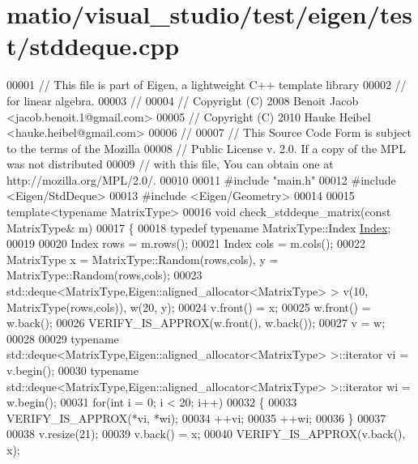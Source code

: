 \hypertarget{matio_2visual__studio_2test_2eigen_2test_2stddeque_8cpp_source}{}\section{matio/visual\+\_\+studio/test/eigen/test/stddeque.cpp}
\label{matio_2visual__studio_2test_2eigen_2test_2stddeque_8cpp_source}

\begin{DoxyCode}
00001 \textcolor{comment}{// This file is part of Eigen, a lightweight C++ template library}
00002 \textcolor{comment}{// for linear algebra.}
00003 \textcolor{comment}{//}
00004 \textcolor{comment}{// Copyright (C) 2008 Benoit Jacob <jacob.benoit.1@gmail.com>}
00005 \textcolor{comment}{// Copyright (C) 2010 Hauke Heibel <hauke.heibel@gmail.com>}
00006 \textcolor{comment}{//}
00007 \textcolor{comment}{// This Source Code Form is subject to the terms of the Mozilla}
00008 \textcolor{comment}{// Public License v. 2.0. If a copy of the MPL was not distributed}
00009 \textcolor{comment}{// with this file, You can obtain one at http://mozilla.org/MPL/2.0/.}
00010 
00011 \textcolor{preprocessor}{#include "main.h"}
00012 \textcolor{preprocessor}{#include <Eigen/StdDeque>}
00013 \textcolor{preprocessor}{#include <Eigen/Geometry>}
00014 
00015 \textcolor{keyword}{template}<\textcolor{keyword}{typename} MatrixType>
00016 \textcolor{keywordtype}{void} check\_stddeque\_matrix(\textcolor{keyword}{const} MatrixType& m)
00017 \{
00018   \textcolor{keyword}{typedef} \textcolor{keyword}{typename} MatrixType::Index \hyperlink{namespace_eigen_a62e77e0933482dafde8fe197d9a2cfde}{Index};
00019   
00020   Index rows = m.rows();
00021   Index cols = m.cols();
00022   MatrixType x = MatrixType::Random(rows,cols), y = MatrixType::Random(rows,cols);
00023   std::deque<MatrixType,Eigen::aligned\_allocator<MatrixType> > v(10, MatrixType(rows,cols)), w(20, y);
00024   v.front() = x;
00025   w.front() = w.back();
00026   VERIFY\_IS\_APPROX(w.front(), w.back());
00027   v = w;
00028 
00029   \textcolor{keyword}{typename} std::deque<MatrixType,Eigen::aligned\_allocator<MatrixType> >::iterator vi = v.begin();
00030   \textcolor{keyword}{typename} std::deque<MatrixType,Eigen::aligned\_allocator<MatrixType> >::iterator wi = w.begin();
00031   \textcolor{keywordflow}{for}(\textcolor{keywordtype}{int} i = 0; i < 20; i++)
00032   \{
00033     VERIFY\_IS\_APPROX(*vi, *wi);
00034     ++vi;
00035     ++wi;
00036   \}
00037 
00038   v.resize(21);  
00039   v.back() = x;
00040   VERIFY\_IS\_APPROX(v.back(), x);

\end{DoxyCode}

